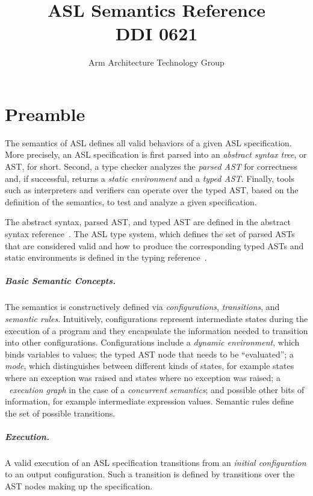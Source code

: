 \documentclass{book}
\author{Arm Architecture Technology Group}
\title{ASL Semantics Reference \\
       DDI 0621}
\begin{document}
\maketitle

\tableofcontents{}





\chapter{Preamble}

The semantics of ASL defines all valid behaviors of a given ASL specification.
More precisely, an ASL specification is first parsed into an \emph{abstract syntax tree},
or AST, for short. Second, a type checker analyzes the \emph{parsed AST} for correctness and, if successful,
returns a \emph{static environment} and a \emph{typed AST}. Finally, tools such as interpreters and verifiers
can operate over the typed AST, based on the definition of the semantics, to test and analyze a given specification.

The abstract syntax, parsed AST, and typed AST are defined in the abstract syntax reference~\cite{ASLAbstractSyntaxReference}.
The ASL type system, which defines the set of parsed ASTs that are considered valid and how to
produce the corresponding typed ASTs and static environments is defined in the typing reference~\cite{ASLTypingReference}.

\paragraph{Basic Semantic Concepts.}
The semantics is constructively defined via \emph{configurations}, \emph{transitions}, and \emph{semantic rules}.
Intuitively, configurations represent intermediate states during the execution of a program and they encapsulate
the information needed to transition into other configurations.
Configurations include a \emph{dynamic environment}, which binds variables to values;
the typed AST node that needs to be ``evaluated''; a \emph{mode}, which distinguishes between different kinds of states, for example
states where an exception was raised and states where no exception was raised; a \herd\ \emph{execution graph} in the case of a
\emph{concurrent semantics}; and possible other bits of information, for example intermediate expression values.
Semantic rules define the set of possible transitions.

\paragraph{Execution.}
A valid execution of an ASL specification transitions from an \emph{initial configuration} to an output configuration.
Such a transition is defined by transitions over the AST nodes making up the specification.
\end{document}
